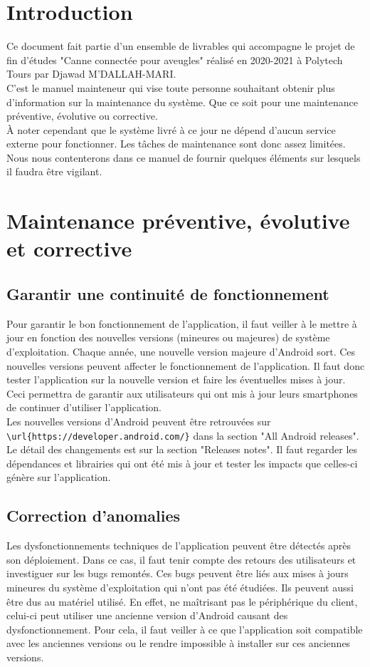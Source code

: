 \documentclass[UTF8]{EPURapport}
\begin{document}
\chapter{Introduction}

Ce document fait partie d'un ensemble de livrables qui accompagne le projet de fin d'études "Canne connectée pour aveugles" réalisé en 2020-2021 à Polytech Tours par Djawad M'DALLAH-MARI.\\

C'est le manuel mainteneur qui vise toute personne souhaitant obtenir plus d'information sur la maintenance du système. Que ce soit pour une maintenance préventive, évolutive ou corrective.\\

À noter cependant que le système livré à ce jour ne dépend d'aucun service externe pour fonctionner. Les tâches de maintenance sont donc assez limitées. Nous nous contenterons dans ce manuel de fournir quelques éléments sur lesquels il faudra être vigilant. 

\chapter{Maintenance préventive, évolutive et corrective}
\section{Garantir une continuité de fonctionnement}
Pour garantir le bon fonctionnement de l'application, il faut veiller à le mettre à jour en fonction des nouvelles versions (mineures ou majeures) de système d'exploitation. Chaque année, une nouvelle version majeure d'Android sort. Ces nouvelles versions peuvent affecter le fonctionnement de l'application. Il faut donc tester l'application sur la nouvelle version et faire les éventuelles mises à jour. Ceci permettra de garantir aux utilisateurs qui ont mis à jour leurs smartphones de continuer d'utiliser l'application.\\

Les nouvelles versions d'Android peuvent être retrouvées sur  \verb|\url{https://developer.android.com/}| dans la section "All Android releases". Le détail des changements est sur la section "Releases notes". Il faut regarder les dépendances et librairies qui ont été mis à jour et tester les impacts que celles-ci génère sur l'application.

\section{Correction d'anomalies}
Les dysfonctionnements techniques de l'application peuvent être détectés après son déploiement. Dans ce cas, il faut tenir compte des retours des utilisateurs et investiguer sur les bugs remontés. Ces bugs peuvent être liés aux mises à jours mineures du système d'exploitation qui n'ont pas été étudiées. Ils peuvent aussi être dus au matériel utilisé. En effet, ne maîtrisant pas le périphérique du client, celui-ci peut utiliser une ancienne version d'Android causant des dysfonctionnement. Pour cela, il faut veiller à ce que l'application soit compatible avec les anciennes versions ou le rendre impossible à installer sur ces anciennes versions.
\end{document}
